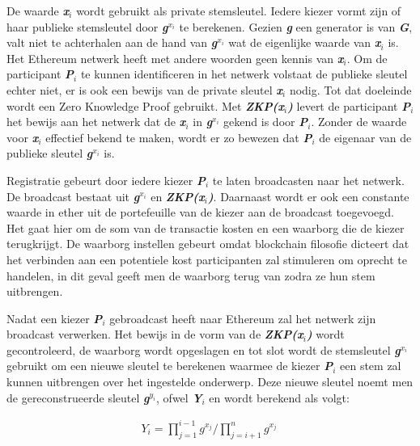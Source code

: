			 De waarde \textbf{\textit{x$_{i}$}} wordt gebruikt als private stemsleutel. Iedere kiezer vormt zijn of haar publieke stemsleutel door \textbf{\textit{g$^{x_{i}}$}} te berekenen. Gezien \textbf{\textit{g}} een generator is van \textbf{\textit{G}}, valt niet te achterhalen aan de hand van \textbf{\textit{g$^{x_{i}}$}} wat de eigenlijke waarde van \textbf{\textit{x$_{i}$}} is. Het Ethereum netwerk heeft met andere woorden geen kennis van \textbf{\textit{x$_{i}$}}. Om de participant \textbf{\textit{P$_{i}$}} te kunnen identificeren in het netwerk volstaat de publieke sleutel echter niet, er is ook een bewijs van de private sleutel \textbf{\textit{x$_{i}$}} nodig. Tot dat doeleinde wordt een Zero Knowledge Proof gebruikt. Met \textbf{\textit{ZKP(x$_{i}$)}} levert de participant \textbf{\textit{P$_{i}$}}  het bewijs aan het netwerk dat de \textbf{\textit{x$_{i}$}}  in \textbf{\textit{g$^{x_{i}}$}} gekend is door \textbf{\textit{P$_{i}$}}. Zonder de waarde voor \textbf{\textit{x$_{i}$}}  effectief bekend te maken, wordt er zo bewezen dat \textbf{\textit{P$_{i}$}} de eigenaar van de publieke sleutel \textbf{\textit{g$^{x_{i}}$}} is.
			
			Registratie gebeurt door iedere kiezer \textbf{\textit{P$_{i}$}} te laten broadcasten naar het netwerk. De broadcast bestaat uit \textbf{\textit{g$^{x_{i}}$}}  en \textbf{\textit{ZKP(x$_{i}$)}}. Daarnaast wordt er ook een constante waarde in ether uit de portefeuille van de kiezer aan de broadcast toegevoegd. Het gaat hier om de som van de transactie kosten en een waarborg die de kiezer terugkrijgt. De waarborg instellen gebeurt omdat blockchain filosofie dicteert dat het verbinden aan een potentiele kost participanten zal stimuleren om oprecht te handelen, in dit geval geeft men de waarborg terug van zodra ze hun stem uitbrengen. 
			
			Nadat een kiezer \textbf{\textit{P$_{i}$}}  gebroadcast heeft naar Ethereum zal het netwerk zijn broadcast verwerken. Het bewijs in de vorm van de \textbf{\textit{ZKP(x$_{i}$)}} wordt gecontroleerd, de waarborg wordt opgeslagen en tot slot wordt de  stemsleutel \textbf{\textit{g$^{x_{i}}$}} gebruikt om een nieuwe sleutel te berekenen waarmee de kiezer \textbf{\textit{P$_{i}$}} een stem zal kunnen uitbrengen over het ingestelde onderwerp. Deze nieuwe sleutel noemt men de gereconstrueerde sleutel \textbf{\textit{g$^{y_{i}}$}}, ofwel \textbf{\textit{Y$_{i}$}} en wordt berekend als volgt: 
			\begin{ceqn}
				\begin{align}
					Y_{i} = \prod_{j=1}^{i-1}g^{x_{j}}  / \prod_{j=i+1}^{n}g^{x_{j}} \label{formula1}\
				\end{align}
			\end{ceqn}
			
